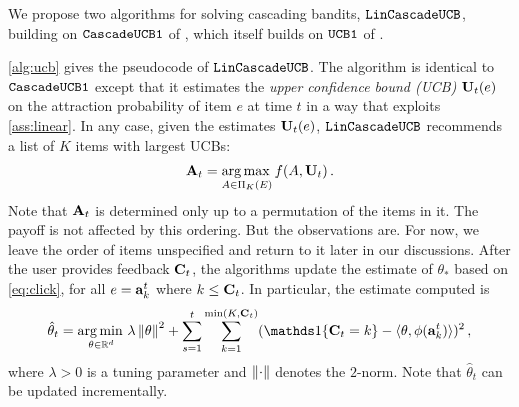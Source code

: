 We propose two algorithms for solving cascading bandits, ${\tt LinCascadeUCB}$, building on ${\tt CascadeUCB1}$ of 
  \citet{kveton15cascade}, which itself builds on ${\tt UCB1}$ of \cite{auer02finitetime}.

\cref{alg:ucb} gives the pseudocode of ${\tt LinCascadeUCB}$. 
The algorithm is identical to ${\tt CascadeUCB1}$ except that it estimates the 
\emph{upper confidence bound (UCB)} $\mathbf{U}_t(e)$ on the attraction probability of item $e$ at time $t$
in a way that exploits \cref{ass:linear}. In any case, given the estimates $\mathbf{U}_t(e)$,
${\tt LinCascadeUCB}$ recommends a list of $K$ items with largest UCBs:
\begin{align}
  \mathbf{A}_t = \operatorname*{arg\,max\,}_{A \in \Pi_K(E)} f(A, \mathbf{U}_t)\,.
\end{align}
Note that $\mathbf{A}_t$ is determined only up to a permutation of the items in it. The payoff is not affected by this ordering. But the observations are. For now, we leave the order of items unspecified and return to it later in our discussions. After the user provides feedback $\mathbf{C}_t$, the algorithms update the estimate of $\theta_*$ 
based on \eqref{eq:click}, for all $e = \mathbf{a}^t_k$ where $k \leq \mathbf{C}_t$.
In particular, the estimate computed is
\begin{align}
\label{eq:ridge}
\hat{\theta}_t = \argmin_{\theta\in \R^d}
\lambda \norm{\theta}^2 + 
 \sum_{s=1}^t \sum_{k=1}^{\min(K,\rnd{C}_t)} ( \I{\rnd{C}_t = k} - \ip{\theta,\phi(\rnd{a}^t_k)})^2 \,,
\end{align}
where $\lambda>0$ is a tuning parameter and $\left\|\cdot\right\|$ denotes the $2$-norm.
Note that $\hat{\theta}_t$ can be updated incrementally. 

